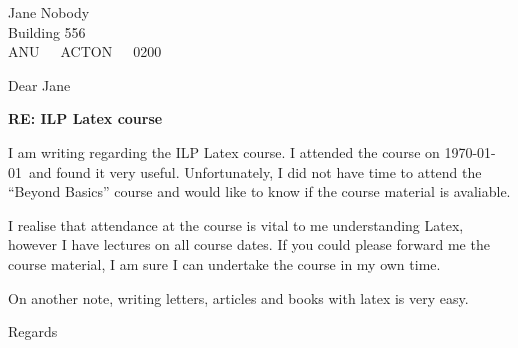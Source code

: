 \documentclass[a4paper,12pt]{letter}
\begin{document}
\address{Joe Bloggs \\ Building 555 \\ ANU\ \ \ ACTON\ \ \ 0200}
\signature{Joe Bloggs}
\begin{letter}{Jane Nobody \\  Building 556 \\ ANU\ \ \ ACTON\ \ \ 0200}
\opening{Dear Jane}

\begin{center}
\textbf{RE: ILP Latex course}
\end{center}

I am writing regarding the ILP Latex course.  I attended the course on \today\ and found it very useful.  Unfortunately, I did not have time to attend the ``Beyond Basics'' course and would like to know if the course material is avaliable.

I realise that attendance at the course is vital to me understanding Latex, however I have lectures on all course dates.  If you could please forward me the course material, I am sure I can undertake the course in my own time.

On another note, writing letters, articles and books with latex is very easy.

\closing{Regards}
\end{letter}
\end{document}
